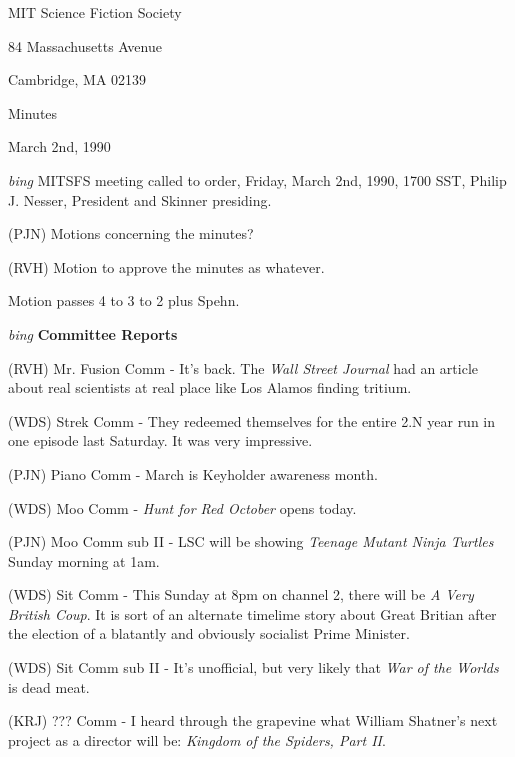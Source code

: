 \setlength{\topmargin}{-0.5in}
\setlength{\oddsidemargin}{0.0in}
\setlength{\evensidemargin}{0.0in}
\setlength{\textheight}{9in}
\setlength{\textwidth}{6.5in}



\begin{center}
MIT Science Fiction Society

84 Massachusetts Avenue

Cambridge, MA 02139

\vspace{0.2in}
Minutes

March 2nd, 1990

\end{center}
 
\vspace{0.15in}
{\em bing\/}  MITSFS meeting called to order, Friday, March 2nd, 1990,
1700 SST, Philip J. Nesser, President and Skinner presiding.

(PJN) Motions concerning the minutes?

(RVH) Motion to approve the minutes as whatever.

Motion passes 4 to 3 to 2 plus Spehn.

\vspace{0.15in}
{\em bing\/} {\bf Committee Reports}

(RVH) Mr. Fusion Comm - It's back.  The {\em Wall Street Journal} had
an article about real scientists at real place like Los Alamos finding
tritium.

(WDS) Strek Comm - They redeemed themselves for the entire 2.N year
run in one episode last Saturday.  It was very impressive.

(PJN) Piano Comm - March is Keyholder awareness month.

(WDS) Moo Comm - {\em Hunt for Red October} opens today.

(PJN) Moo Comm sub II - LSC will be showing {\em Teenage Mutant Ninja
Turtles} Sunday morning at 1am.

(WDS) Sit Comm - This Sunday at 8pm on channel 2, there will be {\em A
Very British Coup}.  It is sort of an alternate timelime story about
Great Britian after the election of a blatantly and obviously
socialist Prime Minister.

(WDS) Sit Comm sub II - It's unofficial, but very likely that {\em War
of the Worlds} is dead meat.

(KRJ) ??? Comm - I heard through the grapevine what William Shatner's
next project as a director will be: {\em Kingdom of the Spiders, Part
II}.


